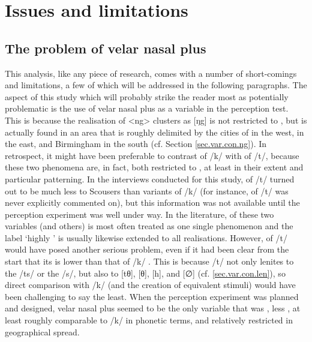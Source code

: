 	\section{Issues and limitations}
		\label{sec.perc_res.disc.issues}

		\subsection{The problem of velar nasal plus}

This analysis, like any piece of research, comes with a number of short-comings and limitations, a few of which will be addressed in the following paragraphs.
The aspect of this study which will probably strike the reader most as potentially problematic is the use of velar nasal plus as a variable in the perception test.
This is because the realisation of <ng> clusters as [ŋg] is not restricted to , but is actually found in an area that is roughly delimited by the cities of  in the west,  in the east, and Birmingham in the south (cf. Section \ref{sec.var.con.ng}).
In retrospect, it might have been preferable to contrast  of /k/ with  of /t/, because these two phenomena are, in fact, both restricted to , at least in their extent and particular patterning.
In the interviews conducted for this study,  of /t/ turned out to be much less  to Scousers than  variants of /k/ (for instance,  of /t/ was never explicitly commented on), but this information was not available until the perception experiment was well under way.
In the literature,  of these two variables (and others) is most often treated as one single phenomenon and the label `highly ' is usually likewise extended to all   realisations.
However,  of /t/ would have posed another serious problem, even if it had been clear from the start that its  is lower than that of /k/ .
This is because /t/ not only lenites to the  /ts/ or the  /s/, but also to [tθ], [θ], [h], and [∅] (cf. \ref{sec.var.con.len}), so direct comparison with /k/ (and the creation of equivalent stimuli) would have been challenging to say the least.
When the perception experiment was planned and designed, velar nasal plus seemed to be the only  variable that was , less , at least roughly comparable to /k/ in phonetic terms, and relatively restricted in geographical spread.

